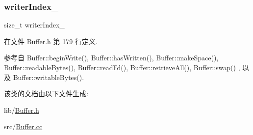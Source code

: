 \mbox{\label{classmuduo_1_1Buffer_a642726abccc15af160d55735b2ed5d9a}} 
\subsubsection{\texorpdfstring{writer\+Index\+\_\+}{writerIndex\_}}
{\footnotesize\ttfamily size\+\_\+t writer\+Index\+\_\+\hspace{0.3cm}{\ttfamily [private]}}



在文件 Buffer.\+h 第 179 行定义.



参考自 Buffer\+::begin\+Write(), Buffer\+::has\+Written(), Buffer\+::make\+Space(), Buffer\+::readable\+Bytes(), Buffer\+::read\+Fd(), Buffer\+::retrieve\+All(), Buffer\+::swap() , 以及 Buffer\+::writable\+Bytes().



该类的文档由以下文件生成\+:\begin{DoxyCompactItemize}
\item 
lib/\hyperlink{Buffer_8h}{Buffer.\+h}\item 
src/\hyperlink{Buffer_8cc}{Buffer.\+cc}\end{DoxyCompactItemize}
